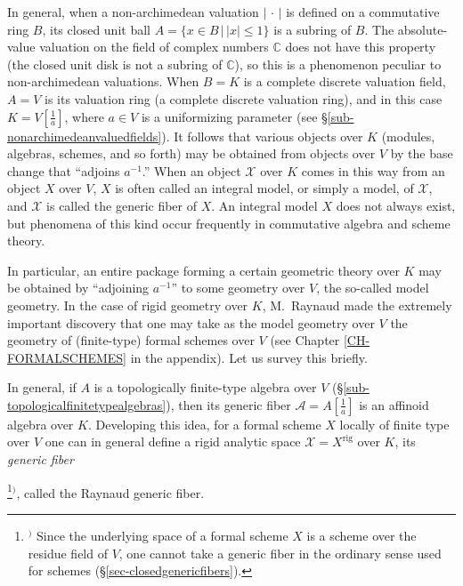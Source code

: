 \documentclass[a4paper,12pt, dvipdfmx]{jsbook}
\def\C{\mathbb{C}}
\def\rig{\mathop{\mathrm{rig}}\nolimits}
\newcommand{\abs}[1]{\lvert#1\rvert}
\theoremstyle{plain}
\theoremstyle{definition}
\newcounter{chushaku}
\def\chu#1{\addtocounter{chushaku}{1}\footnote[\value{chushaku}]{${}^)$ #1}${}^)$}
\begin{document}
In general, when a non-archimedean valuation $\abs{\,\cdot\,}$ is defined on a commutative ring $B$, its closed unit ball $A=\{x\in B\,|\,\abs{x}\leq 1\}$ is a subring of $B$.
The absolute-value valuation on the field of complex numbers $\C$ does not have this property (the closed unit disk is not a subring of $\C$), so this is a phenomenon peculiar to non-archimedean valuations.
When $B=K$ is a complete discrete valuation field, $A=V$ is its valuation ring (a complete discrete valuation ring), and in this case $K=V[\frac{1}{a}]$, where $a\in V$ is a uniformizing parameter (see \S\ref{sub-nonarchimedeanvaluedfields}).
It follows that various objects over $K$ (modules, algebras, schemes, and so forth) may be obtained from objects over $V$ by the base change that ``adjoins $a^{-1}$.''
When an object $\mathcal{X}$ over $K$ comes in this way from an object $X$ over $V$, $X$ is often called an integral model, or simply a model, of $\mathcal{X}$, and $\mathcal{X}$ is called the generic fiber of $X$.
An integral model $X$ does not always exist, but phenomena of this kind occur frequently in commutative algebra and scheme theory.

In particular, an entire package forming a certain geometric theory over $K$ may be obtained by ``adjoining $a^{-1}$'' to some geometry over $V$, the so-called model geometry.
In the case of rigid geometry over $K$, M.\ Raynaud made the extremely important discovery that one may take as the model geometry over $V$ the geometry of (finite-type) formal schemes over $V$ (see Chapter \ref{CH-FORMALSCHEMES} in the appendix). Let us survey this briefly.

In general, if $A$ is a topologically finite-type algebra over $V$ (\S\ref{sub-topologicalfinitetypealgebras}), then its generic fiber $\mathcal{A}=A[\frac{1}{a}]$ is an affinoid algebra over $K$.
Developing this idea, for a formal scheme $X$ locally of finite type over $V$ one can in general define a rigid analytic space $\mathcal{X}=X^{\rig}$ over $K$, its {\it generic fiber}\chu{Since the underlying space of a formal scheme $X$ is a scheme over the residue field of $V$, one cannot take a generic fiber in the ordinary sense used for schemes (\S\ref{sec-closedgenericfibers}).}, called the Raynaud generic fiber.
\end{document}
